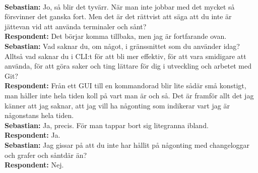 \documentclass[a4paper,oneside]{bth} %
\begin{document}
		\\\textbf{Sebastian:} Jo, så blir det tyvärr. När man inte jobbar med det mycket så försvinner det ganska fort. Men det är det rättvist att säga att du inte är jättevan vid att använda terminaler och sånt?
		\\\textbf{Respondent:} Det börjar komma tillbaka, men jag är fortfarande ovan.
		\\\textbf{Sebastian:} Vad saknar du, om något, i gränssnittet som du använder idag? Alltså vad saknar du i CLI:t för att bli mer effektiv, för att vara smidigare att använda, för att göra saker och ting lättare för dig i utveckling och arbetet med Git?
		\\\textbf{Respondent:} Från ett GUI till en kommandorad blir lite sådär små konstigt, man håller inte hela tiden koll på vart man är och så. Det är framför allt det jag känner att jag saknar, att jag vill ha någonting som indikerar vart jag är någonstans hela tiden.
		\\\textbf{Sebastian:} Ja, precis. För man tappar bort sig litegranna ibland.
		\\\textbf{Respondent:} Ja.
		\\\textbf{Sebastian:} Jag gissar på att du inte har hållit på någonting med changeloggar och grafer och såntdär än?
		\\\textbf{Respondent:} Nej.
		
\end{document}

